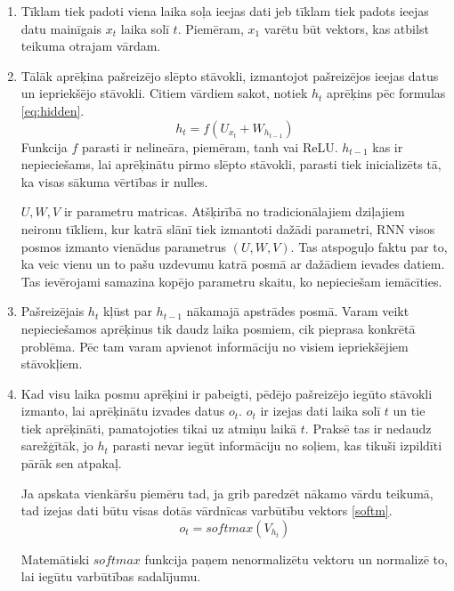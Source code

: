 \documentclass[12pt,paper=A4]{report}
\begin{document}
    \begin{enumerate}
        
    \item Tīklam tiek padoti viena laika soļa ieejas dati jeb tīklam tiek padots ieejas datu mainīgais $x_t$ laika solī $t$. Piemēram, $x_1$ varētu būt vektors, kas atbilst teikuma otrajam vārdam.
    
    \item Tālāk aprēķina pašreizējo slēpto stāvokli, izmantojot pašreizējos ieejas datus un iepriekšējo stāvokli. Citiem vārdiem sakot, notiek $h_t$ aprēķins pēc formulas \ref{eq:hidden}.
    \begin{equation}
    h_t = f(U_{x_t}+W_{h_{t-1}})
    \label{eq:hidden}
    \end{equation}
     Funkcija $f$ parasti ir nelineāra, piemēram, tanh vai ReLU. $h_{t-1}$ kas ir nepieciešams, lai aprēķinātu pirmo slēpto stāvokli, parasti tiek inicializēts tā, ka visas sākuma vērtības ir nulles.
    
     $U,W,V$ ir parametru matricas. Atšķirībā no tradicionālajiem dziļajiem neironu tīkliem, kur katrā slānī tiek izmantoti dažādi parametri, RNN visos posmos izmanto vienādus parametrus $(U,W,V)$. Tas atspoguļo faktu par to, ka veic vienu un to pašu uzdevumu katrā posmā ar dažādiem ievades datiem. Tas ievērojami samazina kopējo parametru skaitu, ko nepieciešam iemācīties.

     
    \item Pašreizējais $h_t$ kļūst par $h_{t-1}$ nākamajā apstrādes posmā. Varam veikt nepieciešamos aprēķinus tik daudz laika posmiem, cik pieprasa konkrētā problēma. Pēc tam varam apvienot informāciju no visiem iepriekšējiem stāvokļiem.

    \item Kad visu laika posmu aprēķini ir pabeigti, pēdējo pašreizējo iegūto stāvokli izmanto, lai aprēķinātu izvades datus $o_t$. $o_t$  ir izejas dati laika solī $t$ un tie tiek aprēķināti, pamatojoties tikai uz atmiņu laikā $t$. Praksē tas ir nedaudz sarežģītāk, jo $h_t$ parasti nevar iegūt informāciju no soļiem, kas tikuši izpildīti pārāk sen atpakaļ.
    
      Ja apskata vienkāršu piemēru tad, ja grib paredzēt nākamo vārdu teikumā, tad izejas dati būtu visas dotās vārdnīcas varbūtību vektors \ref{softm}.
    \begin{equation}
    o_t = softmax(V_{h_t})
    \label{softm}
    \end{equation}
   
    Matemātiski $softmax$ funkcija paņem nenormalizētu vektoru un normalizē to, lai iegūtu varbūtības sadalījumu.


\end{enumerate}
\end{document}

